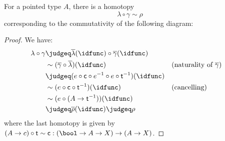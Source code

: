 \documentclass{article}
\newcommand{\smsh}{\wedge}
\renewcommand{\o}{\ensuremath{\circ}}
\newcommand{\sy}{^{-1}}
\newcommand{\rhobar}{\overline{\rho}}
\newcommand{\lambdabar}{\overline{\lambda}}
\newcommand{\gammabar}{\overline{\gamma}}
\newcommand{\two}{\mathsf{t}}
\newcommand{\twist}{\mathsf{c}}
\begin{document}
\begin{thm}\label{thm:smash-braiding-unitors}
	For a pointed type $A$, there is a homotopy
	\[\lambda \o \gamma \sim \rho\]
	corresponding to the commutativity of the following diagram:
	\begin{center}
	\end{center}
\end{thm}
\begin{proof}
	We have:
	\begin{align*}
		\lambda \o \gamma
		&\judgeq \lambdabar(\idfunc) \o \gammabar(\idfunc)\\
		&\sim (\gammabar \o \lambdabar)(\idfunc) &&\text{(naturality of $\gammabar$)}\\
		&\judgeq (e \o \twist \o e\sy \o e \o \two\sy)(\idfunc)\\
		&\sim (e \o \twist \o \two\sy)(\idfunc) &&\text{(cancelling)}\\
		&\sim (e \o (A \to \two\sy))(\idfunc)\\
		&\judgeq \rhobar(\idfunc) \judgeq \rho
	\end{align*}		
	where the last homotopy is given by $(A \to c) \o \two \sim \twist : (\bool \to A \to X) \to (A \to X)$.
\end{proof}
\end{document}
